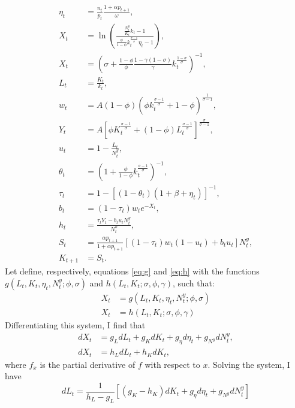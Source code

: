 \documentclass[
]{article}
\begin{document}
\begin{align}
    \eta_t &= \frac{n_t}{p_t}\frac{1+\alpha p_{t+1}}{\omega}, \\
    X_t &= \ln\left( \frac{ \frac{N_t^y}{K_t} k_t - 1 } { \frac{\phi}{1-\phi} k_t^{\frac{\sigma-1}{\sigma}} \eta_t - 1 }\right), \label{eq:g} \\
    X_t &= \left( \sigma + \frac{1-\phi}{\phi} \frac{1-\gamma(1-\sigma)}{\gamma} k_t^{\frac{1-\sigma}{\sigma}} \right)^{-1}, \label{eq:h}\\
    L_t &= \frac{K_t}{k_t},\\
    w_t &= A(1-\phi)\left( \phi k_t^\frac{\sigma-1}{\sigma} + 1-\phi \right)^\frac{1}{\sigma-1},\\
    Y_t &= A \left[ \phi K_t^\frac{\sigma-1}{\sigma} + (1-\phi) L_t^\frac{\sigma-1}{\sigma} \right]^\frac{\sigma}{\sigma-1},\\
    u_t &= 1 - \frac{L_t}{N_t^y},\\
    \theta_t &= \left(1 + \frac{\phi}{1-\phi} k_t^\frac{\sigma-1}{\sigma} \right)^{-1},\\
    \tau_t &= 1 - \left[ (1-\theta_t)(1+\beta+\eta_t) \right]^{-1},\\
    b_t &= (1-\tau_t) w_t e^{-X_t},\\
    h_t &= \frac{\tau_t Y_t - b_t u_t N_t^y}{N_t^o},\\
    S_t &= \frac{\alpha p_{t+1}}{1 + \alpha p_{t+1}} \left[ (1-\tau_t)w_t(1-u_t) + b_tu_t \right] N_t^y,\\
    K_{t+1} &= S_t.
\end{align}
Let define, respectively, equations \eqref{eq:g} and \eqref{eq:h} with the functions \(g(L_t, K_t, \eta_t, N_t^y; \phi, \sigma)\) and \(h(L_t, K_t; \sigma, \phi, \gamma)\), such that:
\begin{align*}
    X_t &= g(L_t, K_t, \eta_t, N_t^y; \phi, \sigma) \\
    X_t &= h(L_t, K_t; \sigma, \phi, \gamma)
\end{align*}
Differentiating this system, I find that
\begin{align*}
    dX_t &= g_L dL_t + g_K dK_t + g_\eta d\eta_t + g_{N^y} dN_t^y, \\
    dX_t &= h_L dL_t + h_K dK_t,
\end{align*}
where \(f_x\) is the partial derivative of \(f\) with respect to \(x\). Solving the system, I have
\begin{equation*}
    dL_t = \frac{1}{h_L-g_L}\left[(g_K-h_K) dK_t + g_\eta d\eta_t + g_{N^y} dN_t^y \right]
\end{equation*}
\end{document}
